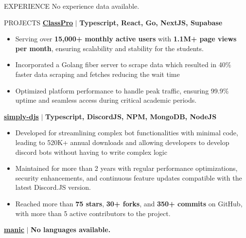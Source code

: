 \documentclass{resume} %
\begin{document}






\begin{rSection}{EXPERIENCE}
    No experience data available.
\end{rSection}



\begin{rSection}{PROJECTS}    
    \textbf{\href{https://github.com/Rahuletto/ClassPro}{ClassPro}} \(\mid\) \textbf{Typescript, React, Go, NextJS, Supabase}
\begin{itemize}
\itemsep -3pt{}
\item Serving over \textbf{15,000+ monthly active users} with \textbf{1.1M+ page views per month}, ensuring scalability and stability for the students.
\item Incorporated a Golang fiber server to scrape data which resulted in 40\% faster data scraping and fetches reducing the wait time
\item Optimized platform performance to handle peak traffic, ensuring 99.9\% uptime and seamless access during critical academic periods.
\end{itemize}
\textbf{\href{https://github.com/Rahuletto/simply-djs}{simply-djs}} \(\mid\) \textbf{Typescript, DiscordJS, NPM, MongoDB, NodeJS}
\begin{itemize}
\itemsep -3pt{}
\item Developed for streamlining complex bot functionalities with minimal code, leading to 520K+ annual downloads and allowing developers to develop discord bots without having to write complex logic
\item Maintained for more than 2 years with regular performance optimizations, security enhancements, and continuous feature updates compatible with the latest Discord.JS version.
\item Reached more than \textbf{75 stars}, \textbf{30+ forks}, and \textbf{350+ commits} on GitHub, with more than 5 active contributors to the project.
\end{itemize}
\textbf{\href{https://github.com/Rahuletto/manic}{manic}} \(\mid\) \textbf{No languages available.}
\end{rSection}
\end{document}
